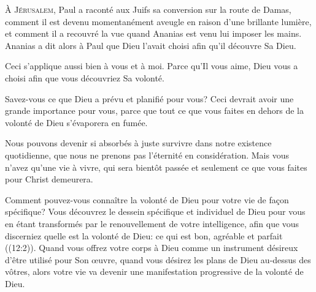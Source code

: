 



\lettrine{À}{ Jérusalem}, Paul a raconté aux Juifs sa conversion
 sur la route de Damas, comment il est devenu momentanément aveugle
 en raison d'une brillante lumière, et comment il a recouvré la vue
 quand Ananias est venu lui imposer les mains.
 Ananias a dit alors à Paul que Dieu l'avait choisi afin qu'il découvre
 Sa Dieu.

Ceci s'applique aussi bien à vous et à moi.
 Parce qu'Il vous aime, Dieu vous a choisi afin que vous découvriez Sa volonté.

Savez-vous ce que Dieu a prévu et planifié pour vous?
 Ceci devrait avoir une grande importance pour vous,
 parce que tout ce que vous faites en dehors de la volonté de Dieu s'évaporera en fumée.


Nous pouvons devenir si absorbés à juste survivre dans notre existence
 quotidienne, que nous ne prenons pas l'éternité en considération.
 Mais vous n'avez qu'une vie à vivre, qui sera bientôt passée
 et seulement ce que vous faites pour Christ demeurera.

Comment pouvez-vous connaître la volonté de Dieu pour votre vie
 de fa\c{c}on spécifique?
 Vous découvrez le dessein spécifique et individuel
 de Dieu pour vous en étant \Og transformés par le renouvellement
 de votre intelligence, afin que vous discerniez quelle est la volonté de Dieu:
 ce qui est bon, agréable et parfait \Fg{} ((12:2)).
 Quand vous offrez votre corps à Dieu comme un instrument désireux
 d'être utilisé pour Son \oe{}uvre, quand vous désirez les plans de Dieu
 au-dessus des vôtres, alors votre vie va devenir une manifestation
 progressive de la volonté de Dieu.


\dvrule





